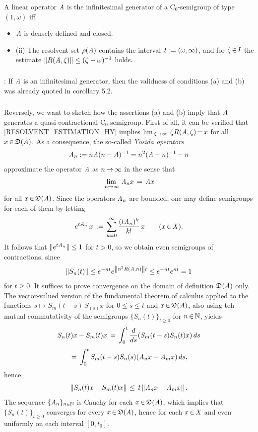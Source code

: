 \documentclass[11pt,twoside]{article}
\begin{document}
\begin{theorem}\label{HY-THEOREM_2}
A linear operator $\linA$ is the infinitesimal generator of a C$_0$-semigroup
{\SG} of type $(1,\omega)$ iff

\begin{itemize}[leftmargin=15pt]
\item[(a)]
$\linA$ is densely defined and closed.
\item[(b)]
(ii) The resolvent set $\rho(\linA)$ contains the interval
$\J:=(\omega,\infty)$,
and for $\zeta \xeof \J$ the estimate
$\norm{R(\linA,\zeta)} \leq (\zeta-\omega)^{-1}$ holds.
\end{itemize}
\end{theorem}

\subparagraph{}
\Proof:
If $\linA$ is an infinitesimal generator,
then the validness of conditions (a) and (b) was already quoted
in corollary 5.2.

\subparagraph{}
Reversely,
we want to sketch how the assertions (a) and (b) imply
that $\linA$ generates a quasi-contractional C$_0$-semigroup.
First of all,
it can be verified that \eqref{RESOLVENT_ESTIMATION_HY} implies
$
\lim_{\,\zeta \to \infty} \, \zeta R(\linA,\zeta) \eq x
$
for all $x \xeof \domain{\linA}$.
As a consequence,
the so-called \textit{Yosida operators}
\[
\linA_{n} := n \linA (n-\linA)^{-1}
               = n^2 (\linA-n)^{-1} - n
\]
approximate the operator $\linA$ as $n \xto \infty$ in the sense that
\[
\lim_{\,n \to \infty} \, \linA_n x \= \linA x
\]
for all $x \xeof \domain{\linA}$.
Since the operators $\linA_n$ are bounded,
one may define semigroups for each of them by letting
\[
e^{t \linA_n}\,x \eqdef
\sum_{k=0}^{\infty} \frac{(t \linA_n)^k}{k!}\,x
\quad \quad (x \xeof \banX).
\]
It follows that $\snorm{e^{t \linA_n}} \leq 1$ for $t > 0$,
so we obtain even semigroups of contractions, since
\[
\norm{S_n(t)} \leq e^{-nt} e^{\norm{n^2R(\linA,n)}t} \leq e^{-nt}e^{nt} = 1
\]
for $t \geq 0$.
It suffices to prove convergence on the domain of definition $\domain{\linA}$
only.
The vector-valued version of the fundamental theorem of calculus applied
to the functions $s \mapsto S_m(t-s)\,S_(s)x$ for $0 \leq s \leq t$ and
$x \xeof \domain{\linA}$,
also using teh mutual commutativity of the semigroups $\{S_n(t)\}_{t \geq 0}$
for $n \xeof \N$,
yields
\[
S_n(t)x - S_m(t)x \= \int_0^t \frac{d}{ds} (S_m(t-s)S_n(t)x)\,ds
\]
\[
\= \int_0^t S_m(t-s)S_n(s)(\linA_nx - \linA_mx) \,ds,
\]
hence
\begin{equation}\label{YYY}
\norm{S_n(t)x - S_m(t)x} \, \leq \, t \norm{\linA_n x - \linA_m x}.
\end{equation}
The sequence $\{\linA_n\}_{n \in \N}$ is Cauchy
for each $x \xeof \domain{\linA}$,
which implies that $\{S_n(t)\}_{t \geq 0}$ converges
for every $x \xeof \domain{\linA}$,
hence for each $x \xeof \banX$ and even uniformly on each interval $[0,t_0]$.
\end{document}
